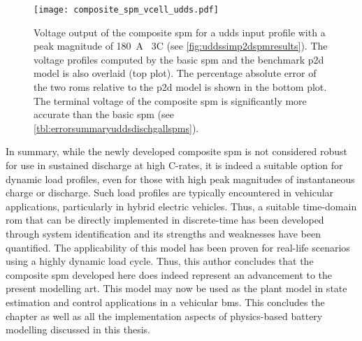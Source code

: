 \begin{figure}[!htbp]
    \centering
    \texttt{[image: composite\_spm\_vcell\_udds.pdf]}
    \caption[%
    Terminal voltage output of --- \emph{a}) the  model, \emph{b}) the
    basic , and \emph{c}) the composite  for a
     input profile.
    ]%
    {%
        Voltage output of the composite \gls{spm} for a \gls{udds} input profile
        with a peak magnitude of \SI{180}{\ampere} \ie~3C
        (see \cref{fig:uddssimp2dspmresults}). The voltage
        profiles computed by the basic \gls{spm} and the benchmark \gls{p2d}
        model is also overlaid (top plot). The percentage absolute error of the
        two \glspl{rom} relative to the \gls{p2d} model is shown in the bottom
        plot. The terminal voltage of the composite \gls{spm} is significantly
        more accurate than the basic \gls{spm}
        (see \cref{tbl:errorsummaryuddsdischgallspms}).
    }%
    \label{fig:voltageoutputcompareallSPMsudds}
\end{figure}



In  summary, while  the newly  developed composite  \gls{spm} is  not considered
robust for use in  sustained discharge at high C-rates, it  is indeed a suitable
option for  dynamic load profiles, even  for those with high  peak magnitudes of
instantaneous charge or discharge. Such  load profiles are typically encountered
in vehicular  applications, particularly  in hybrid  electric vehicles.  Thus, a
suitable time-domain \gls{rom} that can be directly implemented in discrete-time
has  been  developed  through  system   identification  and  its  strengths  and
weaknesses have been quantified. The applicability of this model has been proven
for real-life  scenarios using a  highly dynamic  load cycle. Thus,  this author
concludes that the  composite \gls{spm} developed here does  indeed represent an
advancement to  the present  modelling art. This  model may now  be used  as the
plant  model  in  state  estimation  and control  applications  in  a  vehicular
\gls{bms}. This concludes the chapter as  well as all the implementation aspects
of physics-based battery modelling discussed in this thesis.



